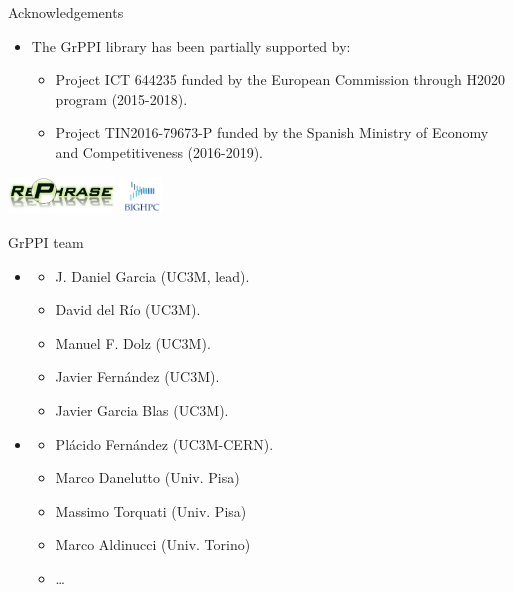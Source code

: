 \begin{frame}[t]{Acknowledgements}
\begin{itemize}
  \item The GrPPI library has been partially supported by:
    \begin{itemize}
      \vfill
      \item Project ICT 644235  
            funded by the European Commission through H2020 program (2015-2018).
      \vfill
      \item Project TIN2016-79673-P  
            funded by the Spanish Ministry of Economy and Competitiveness (2016-2019).
    \end{itemize}
\end{itemize}

\vfill
\begin{center}
\includegraphics[height=1cm]{logos/rephrase.jpg}
\hspace{1cm}
\includegraphics[height=1cm]{logos/bighpc.png}
\end{center}
\end{frame}

\begin{frame}[t]{GrPPI team}
\begin{itemize}
  \item {}
  \begin{itemize}
    \item J. Daniel Garcia (UC3M, lead).
    \item David del Río (UC3M).
    \item Manuel F. Dolz (UC3M).
    \item Javier Fernández (UC3M).
    \item Javier Garcia Blas (UC3M).
  \end{itemize}
  \vfill
  \item {}
  \begin{itemize}
    \item Plácido Fernández (UC3M-CERN).
    \item Marco Danelutto (Univ. Pisa)
    \item Massimo Torquati (Univ. Pisa)
    \item Marco Aldinucci (Univ. Torino)
    \item \ldots
  \end{itemize}
\end{itemize}
\end{frame}
